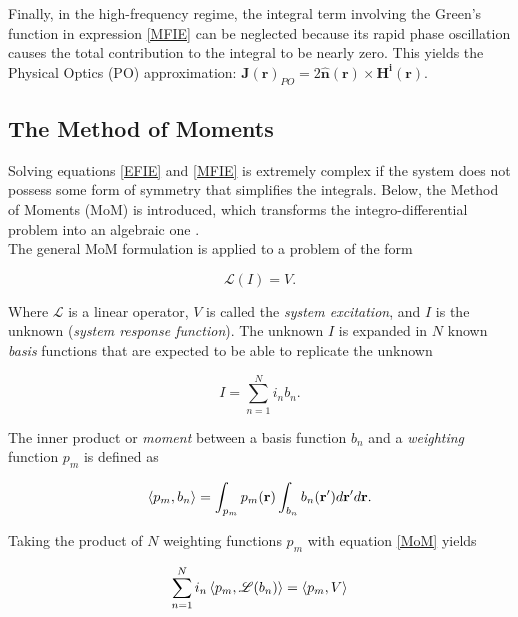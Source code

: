 \documentclass[11pt,a4paper,twoside,pdf]{article}
\numberwithin{equation}{section}
\begin{document}
Finally, in the high-frequency regime, the integral term involving the Green's function in expression \ref{MFIE} can be neglected because its rapid phase oscillation causes the total contribution to the integral to be nearly zero. This yields the Physical Optics (PO) approximation: $\boldsymbol{J}(\boldsymbol{r})_{PO} = 2 \boldsymbol{\hat{n}}(\boldsymbol{r}) \times \boldsymbol{H^i} (\boldsymbol{r})
$.












\subsection{The Method of Moments}



Solving equations \ref{EFIE} and \ref{MFIE} is extremely complex if the system does not possess some form of symmetry that simplifies the integrals. Below, the Method of Moments (MoM) is introduced, which transforms the integro-differential problem into an algebraic one \cite{harrington1993field}.\\

The general MoM formulation is applied to a problem of the form

\begin{equation}
    \mathscr{L} (I) = V.
\label{MoM}
\end{equation}



Where $\mathscr{L}$ is a linear operator, $V$ is called the \textit{system excitation}, and $I$ is the unknown (\textit{system response function}). The unknown $I$ is expanded in $N$ known \textit{basis} functions that are expected to be able to replicate the unknown

$$
    I = \sum_{n=1}^N i_n b_n.
$$

The inner product or \textit{moment} between a basis function $b_n$ and a \textit{weighting} function $p_m$ is defined as

$$
   \braket{p_m, b_n} = \int_{p_m} p_m({\mathbf{r}}) \int_{b_n} b_n({\mathbf{r'}}) d\mathbf{r'} d\mathbf{r}.
$$

Taking the product of $N$ weighting functions $p_m$ with equation \ref{MoM} yields

$$
    \sum_{n=1}^N i_n \braket{p_m, \mathscr{L}(b_n)} = \braket{p_m, V}
$$
\end{document}
